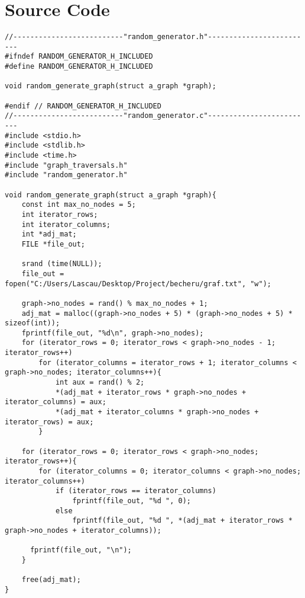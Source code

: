 \documentclass[14pt]{article}
\begin{document}
\section*{Source Code}
\begin{lstlisting}
//--------------------------"random_generator.h"-------------------------
#ifndef RANDOM_GENERATOR_H_INCLUDED
#define RANDOM_GENERATOR_H_INCLUDED

void random_generate_graph(struct a_graph *graph);

#endif // RANDOM_GENERATOR_H_INCLUDED
//--------------------------"random_generator.c"-------------------------
#include <stdio.h>
#include <stdlib.h>
#include <time.h>
#include "graph_traversals.h"
#include "random_generator.h"

void random_generate_graph(struct a_graph *graph){
    const int max_no_nodes = 5;
    int iterator_rows;
    int iterator_columns;
    int *adj_mat;
    FILE *file_out;

    srand (time(NULL));
    file_out = fopen("C:/Users/Lascau/Desktop/Project/becheru/graf.txt", "w");

    graph->no_nodes = rand() % max_no_nodes + 1;
    adj_mat = malloc((graph->no_nodes + 5) * (graph->no_nodes + 5) * sizeof(int));
    fprintf(file_out, "%d\n", graph->no_nodes);
    for (iterator_rows = 0; iterator_rows < graph->no_nodes - 1; iterator_rows++)
        for (iterator_columns = iterator_rows + 1; iterator_columns < graph->no_nodes; iterator_columns++){
            int aux = rand() % 2;
            *(adj_mat + iterator_rows * graph->no_nodes + iterator_columns) = aux;
            *(adj_mat + iterator_columns * graph->no_nodes + iterator_rows) = aux;
        }

    for (iterator_rows = 0; iterator_rows < graph->no_nodes; iterator_rows++){
        for (iterator_columns = 0; iterator_columns < graph->no_nodes; iterator_columns++)
            if (iterator_rows == iterator_columns)
                fprintf(file_out, "%d ", 0);
            else
                fprintf(file_out, "%d ", *(adj_mat + iterator_rows * graph->no_nodes + iterator_columns));

      fprintf(file_out, "\n");
    }

    free(adj_mat);
}

\end{lstlisting}
\end{document}
